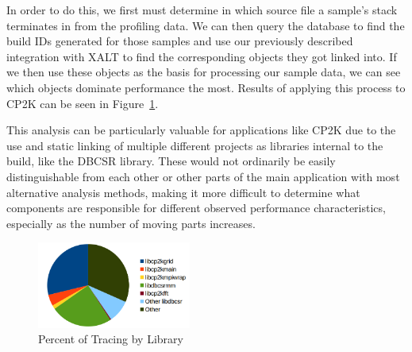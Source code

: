 In order to do this, we first must determine in which source file a sample's stack terminates in from the profiling data.
We can then query the database to find the build IDs generated for those samples and use our previously described integration with XALT to find the corresponding objects they got linked into.
If we then use these objects as the basis for processing our sample data, we can see which objects dominate performance the most.
Results of applying this process to CP2K can be seen in Figure~\ref{fig:library-performance}.

This analysis can be particularly valuable for applications like CP2K due to the use and static linking of multiple different projects as libraries internal to the build, like the \ac{DBCSR} library.
These would not ordinarily be easily distinguishable from each other or other parts of the main application with most alternative analysis methods, making it more difficult to determine what components are responsible for different observed performance characteristics, especially as the number of moving parts increases.

\begin{figure}
\begin{center}
\includegraphics[width=0.45\textwidth]{images/library-performance.png}
\end{center}
\caption{Percent of Tracing by Library}
\label{fig:library-performance}
\end{figure}
